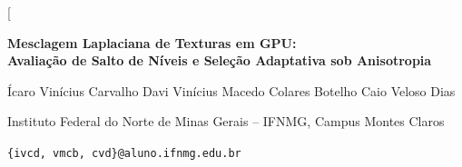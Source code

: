 
\twocolumn[
\begin{center}
{\sffamily\bfseries\fontsize{14}{16}\selectfont
Mesclagem Laplaciana de Texturas em GPU:\\Avaliação de Salto de Níveis e Seleção Adaptativa sob Anisotropia\par}
\vspace{5pt}
{\fontsize{9.5}{11}\selectfont Ícaro Vinícius Carvalho Davi \quad Vinícius Macedo Colares Botelho \quad Caio Veloso Dias\par}
\vspace{2pt}
{\fontsize{8.5}{10}\selectfont Instituto Federal do Norte de Minas Gerais -- IFNMG, Campus Montes Claros\par
\texttt{\{ivcd, vmcb, cvd\}@aluno.ifnmg.edu.br}\par}
\end{center}
